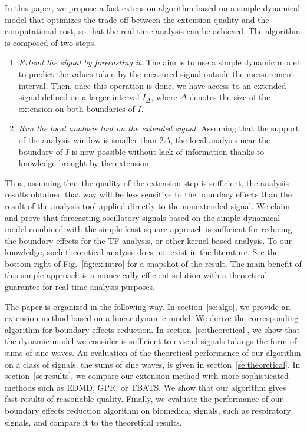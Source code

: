 \documentclass[journal]{IEEEtran}
\begin{document}
In this paper, we propose a fast extension algorithm based on a simple dynamical model that optimizes the trade-off between the extension quality and the computational cost, so that the real-time analysis can be achieved. The algorithm is composed of two steps.
\begin{enumerate}
\item \emph{Extend the signal by forecasting it.} The aim is to use a simple dynamic model to predict the values taken by the measured signal outside the measurement interval. Then, once this operation is done, we have access to an extended signal defined on a larger interval $I_\Delta$, where $\Delta$ denotes the size of the extension on both boundaries of $I$.
\item \emph{Run the local analysis tool on the extended signal.} Assuming that the support of the analysis window is smaller than $2\Delta$, the local analysis near the boundary of $I$ is now possible without lack of information thanks to knowledge brought by the extension. 
\end{enumerate}

Thus, assuming that the quality of the extension step is sufficient, the analysis results obtained that way will be less sensitive to the boundary effects than the result of the analysis tool applied directly to the nonextended signal. We claim and prove that forecasting oscillatory signals based on the simple dynamical model combined with the simple least square approach is sufficient for reducing the boundary effects for the TF analysis, or other kernel-based analysis. To our knowledge, such theoretical analysis does not exist in the literature. See the bottom right of Fig.~\ref{fig:ex.intro} for a snapshot of the result. The main benefit of this simple approach is a numerically efficient solution with a theoretical guarantee for real-time analysis purposes. 

The paper is organized in the following way. In section~\ref{se:algo}, we provide an extension method based on a linear dynamic model. We derive the corresponding algorithm for boundary effects reduction. In section~\ref{se:theoretical}, we show that the dynamic model we consider is sufficient to extend signals takings the form of sums of sine waves. An evaluation of the theoretical performance of our algorithm on a class of signals, the sums of sine waves, is given in section~\ref{se:theoretical}. In section~\ref{se:results}, we compare our extension method with more sophisticated methods such as EDMD, GPR, or TBATS. We show that our algorithm gives fast results of reasonable quality. Finally, we evaluate the performance of our boundary effects reduction algorithm on biomedical signals, such as respiratory signals, and compare it to the theoretical results. 
\end{document}
